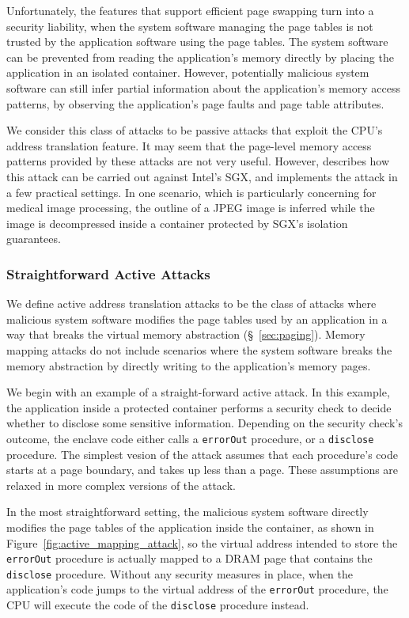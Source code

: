 Unfortunately, the features that support efficient page swapping turn into a
security liability, when the system software managing the page tables is not
trusted by the application software using the page tables. The system software
can be prevented from reading the application's memory directly by placing the
application in an isolated container. However, potentially malicious system
software can still infer partial information about the application's memory
access patterns, by observing the application's page faults and page table
attributes.

We consider this class of attacks to be passive attacks that exploit the CPU's
address translation feature. It may seem that the page-level memory access
patterns provided by these attacks are not very useful. However,
\cite{xu2015pagefaults} describes how this attack can be carried out against
Intel's SGX, and implements the attack in a few practical settings. In one
scenario, which is particularly concerning for medical image processing,
the outline of a JPEG image is inferred while the image is decompressed inside
a container protected by SGX's isolation guarantees.


\subsubsection{Straightforward Active Attacks}
\label{sec:memory_mapping_attacks}

We define active address translation attacks to be the class of attacks where
malicious system software modifies the page tables used by an application in
a way that breaks the virtual memory abstraction (\S~\ref{sec:paging}). Memory
mapping attacks do not include scenarios where the system software breaks the
memory abstraction by directly writing to the application's memory pages.

We begin with an example of a straight-forward active attack. In this example,
the application inside a protected container performs a security check to
decide whether to disclose some sensitive information. Depending on the
security check's outcome, the enclave code either calls a \texttt{errorOut}
procedure, or a \texttt{disclose} procedure. The simplest vesion of the attack
assumes that each procedure's code starts at a page boundary, and takes up less
than a page. These assumptions are relaxed in more complex versions of the
attack.

In the most straightforward setting, the malicious system software directly
modifies the page tables of the application inside the container, as shown in
Figure~\ref{fig:active_mapping_attack}, so the virtual address intended to
store the \texttt{errorOut} procedure is actually mapped to a DRAM page that
contains the \texttt{disclose} procedure. Without any security measures in
place, when the application's code jumps to the virtual address of the
\texttt{errorOut} procedure, the CPU will execute the code of the
\texttt{disclose} procedure instead.

